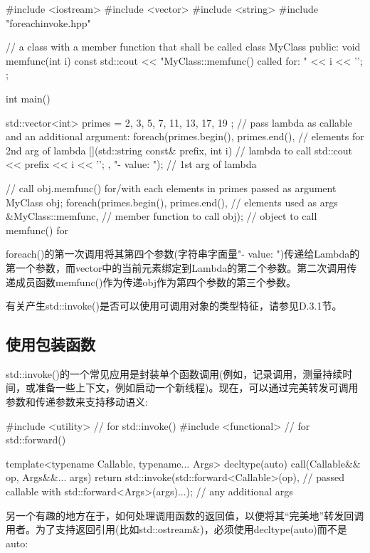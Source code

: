 \begin{cpp}
#include <iostream>
#include <vector>
#include <string>
#include "foreachinvoke.hpp"

// a class with a member function that shall be called
class MyClass {
	public:
	void memfunc(int i) const {
		std::cout << "MyClass::memfunc() called for: " << i << ’\n’;
	}
};

int main()
{
	std::vector<int> primes = { 2, 3, 5, 7, 11, 13, 17, 19 };
	// pass lambda as callable and an additional argument:
	foreach(primes.begin(), primes.end(), // elements for 2nd arg of lambda
			[](std::string const& prefix, int i) { // lambda to call
				std::cout << prefix << i << ’\n’;
			},
			"- value: "); // 1st arg of lambda

	// call obj.memfunc() for/with each elements in primes passed as argument
	MyClass obj;
	foreach(primes.begin(), primes.end(), // elements used as args
			&MyClass::memfunc, // member function to call
			obj); // object to call memfunc() for
}
\end{cpp}

foreach()的第一次调用将其第四个参数(字符串字面量"- value: ")传递给Lambda的第一个参数，而vector中的当前元素绑定到Lambda的第二个参数。第二次调用传递成员函数memfunc()作为传递obj作为第四个参数的第三个参数。

有关产生std::invoke()是否可以使用可调用对象的类型特征，请参见D.3.1节。

\subsection{使用包装函数}

std::invoke()的一个常见应用是封装单个函数调用(例如，记录调用，测量持续时间，或准备一些上下文，例如启动一个新线程)。现在，可以通过完美转发可调用参数和传递参数来支持移动语义:

\begin{cpp}
#include <utility> // for std::invoke()
#include <functional> // for std::forward()

template<typename Callable, typename... Args>
decltype(auto) call(Callable&& op, Args&&... args)
{
	return std::invoke(std::forward<Callable>(op), // passed callable with
					   std::forward<Args>(args)...); // any additional args
}
\end{cpp}

另一个有趣的地方在于，如何处理调用函数的返回值，以便将其“完美地”转发回调用者。为了支持返回引用(比如std::ostream\&)，必须使用decltype(auto)而不是auto:

